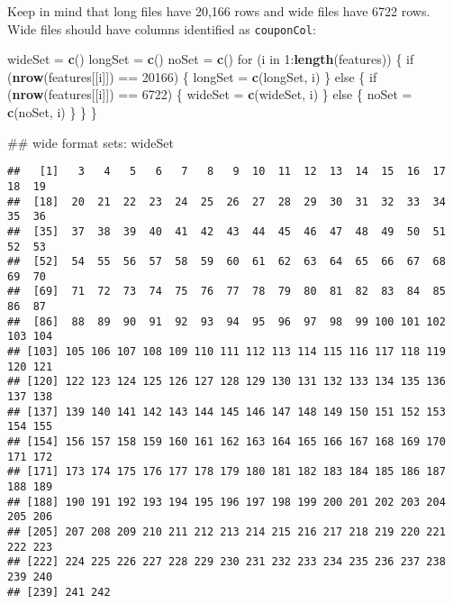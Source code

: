\documentclass[10pt]{report}
\newenvironment{Shaded}{}{}
\newcommand{\KeywordTok}[1]{\textcolor[rgb]{0.00,0.44,0.13}{\textbf{{#1}}}}
\newcommand{\DecValTok}[1]{\textcolor[rgb]{0.25,0.63,0.44}{{#1}}}
\newcommand{\StringTok}[1]{\textcolor[rgb]{0.25,0.44,0.63}{{#1}}}
\newcommand{\NormalTok}[1]{{#1}}
\begin{document}
Keep in mind that long files have 20,166 rows and wide files have 6722
rows. Wide files should have columns identified as \verb!couponCol!:

\begin{Shaded}
\begin{Highlighting}[]
\NormalTok{wideSet =}\StringTok{ }\KeywordTok{c}\NormalTok{()}
\NormalTok{longSet =}\StringTok{ }\KeywordTok{c}\NormalTok{()}
\NormalTok{noSet =}\StringTok{ }\KeywordTok{c}\NormalTok{()}
\NormalTok{for (i in }\DecValTok{1}\NormalTok{:}\KeywordTok{length}\NormalTok{(features)) \{}
    \NormalTok{if (}\KeywordTok{nrow}\NormalTok{(features[[i]]) ==}\StringTok{ }\DecValTok{20166}\NormalTok{) \{}
        \NormalTok{longSet =}\StringTok{ }\KeywordTok{c}\NormalTok{(longSet, i)}
    \NormalTok{\} else \{}
        \NormalTok{if (}\KeywordTok{nrow}\NormalTok{(features[[i]]) ==}\StringTok{ }\DecValTok{6722}\NormalTok{) \{}
            \NormalTok{wideSet =}\StringTok{ }\KeywordTok{c}\NormalTok{(wideSet, i)}
        \NormalTok{\} else \{}
            \NormalTok{noSet =}\StringTok{ }\KeywordTok{c}\NormalTok{(noSet, i)}
        \NormalTok{\}}
    \NormalTok{\}}
\NormalTok{\}}

\NormalTok{## wide format sets:}
\NormalTok{wideSet}
\end{Highlighting}
\end{Shaded}

\begin{verbatim}
##   [1]   3   4   5   6   7   8   9  10  11  12  13  14  15  16  17  18  19
##  [18]  20  21  22  23  24  25  26  27  28  29  30  31  32  33  34  35  36
##  [35]  37  38  39  40  41  42  43  44  45  46  47  48  49  50  51  52  53
##  [52]  54  55  56  57  58  59  60  61  62  63  64  65  66  67  68  69  70
##  [69]  71  72  73  74  75  76  77  78  79  80  81  82  83  84  85  86  87
##  [86]  88  89  90  91  92  93  94  95  96  97  98  99 100 101 102 103 104
## [103] 105 106 107 108 109 110 111 112 113 114 115 116 117 118 119 120 121
## [120] 122 123 124 125 126 127 128 129 130 131 132 133 134 135 136 137 138
## [137] 139 140 141 142 143 144 145 146 147 148 149 150 151 152 153 154 155
## [154] 156 157 158 159 160 161 162 163 164 165 166 167 168 169 170 171 172
## [171] 173 174 175 176 177 178 179 180 181 182 183 184 185 186 187 188 189
## [188] 190 191 192 193 194 195 196 197 198 199 200 201 202 203 204 205 206
## [205] 207 208 209 210 211 212 213 214 215 216 217 218 219 220 221 222 223
## [222] 224 225 226 227 228 229 230 231 232 233 234 235 236 237 238 239 240
## [239] 241 242
\end{verbatim}
\end{document}
